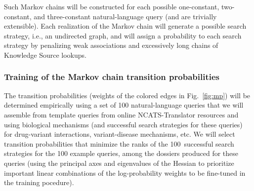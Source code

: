 \documentclass[11pt,notitlepage]{article}
\begin{document}
Such Markov chains will be constructed for each possible one-constant, two-constant,
and three-constant natural-language query (and are trivially extensible). 
 Each realization of the
Markov chain will generate a possible search strategy, i.e., an undirected {\color{red} graph},
and will assign a probability to each search strategy by penalizing weak associations and excessively long chains
of Knowledge Source lookups.

\vspace{-2ex}
\subsubsection{Training of the Markov chain transition probabilities}
The transition probabilities (weights of the
colored edges in Fig.~\ref{fig:mp}) will be determined empirically using a set
of 100 natural-language queries that we will assemble from template queries from
online NCATS-Translator resources and using biological mechanisms (and
successful search strategies for these queries)
for drug-variant interactions, variant-disease mechanisms, etc. We will select
transition probabilities that minimize the ranks of the 100~successful search
strategies for the 100 example queries, among the dossiers produced for these
queries (using the principal axes and eigenvalues of the Hessian to
prioritize important linear combinations of the log-probability weights to
be fine-tuned in the training pocedure).
\vspace{-2ex}
\end{document}
